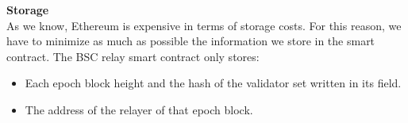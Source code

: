 

\noindent
\textbf{Storage}\\
As we know, Ethereum is expensive in terms of storage costs. For this reason, we have to minimize as much as possible the information we store in the smart contract. The BSC relay smart contract only stores: 
\begin{itemize}
	\item Each epoch block height and the hash of the validator set written in its \extradata field.
	\item The address of the relayer of that epoch block. 
\end{itemize}

